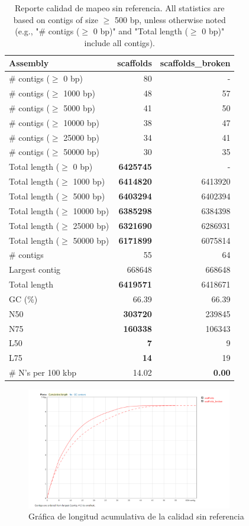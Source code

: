 \documentclass[journal, letterpaper, 11pt]{IEEEtran}
\begin{document}
\begin{table}[H]
\begin{center}
\caption{Reporte calidad de mapeo sin referencia. All statistics are based on contigs of size $\geq$ 500 bp, unless otherwise noted (e.g., "\# contigs ($\geq$ 0 bp)" and "Total length ($\geq$ 0 bp)" include all contigs).}
\begin{tabular}{|l*{2}{|r}|}
\hline
Assembly & scaffolds & scaffolds\_broken \\ \hline
\# contigs ($\geq$ 0 bp) & 80 & - \\ \hline
\# contigs ($\geq$ 1000 bp) & 48 & 57 \\ \hline
\# contigs ($\geq$ 5000 bp) & 41 & 50 \\ \hline
\# contigs ($\geq$ 10000 bp) & 38 & 47 \\ \hline
\# contigs ($\geq$ 25000 bp) & 34 & 41 \\ \hline
\# contigs ($\geq$ 50000 bp) & 30 & 35 \\ \hline
Total length ($\geq$ 0 bp) & {\bf 6425745} & - \\ \hline
Total length ($\geq$ 1000 bp) & {\bf 6414820} & 6413920 \\ \hline
Total length ($\geq$ 5000 bp) & {\bf 6403294} & 6402394 \\ \hline
Total length ($\geq$ 10000 bp) & {\bf 6385298} & 6384398 \\ \hline
Total length ($\geq$ 25000 bp) & {\bf 6321690} & 6286931 \\ \hline
Total length ($\geq$ 50000 bp) & {\bf 6171899} & 6075814 \\ \hline
\# contigs & 55 & 64 \\ \hline
Largest contig & 668648 & 668648 \\ \hline
Total length & {\bf 6419571} & 6418671 \\ \hline
GC (\%) & 66.39 & 66.39 \\ \hline
N50 & {\bf 303720} & 239845 \\ \hline
N75 & {\bf 160338} & 106343 \\ \hline
L50 & {\bf 7} & 9 \\ \hline
L75 & {\bf 14} & 19 \\ \hline
\# N's per 100 kbp & 14.02 & {\bf 0.00} \\ \hline
\end{tabular}
\end{center}
\end{table}

\begin{figure}[H]
\centering
\includegraphics[width=9cm]{imagenes/mapeosin.png}
\caption{Gráfica de longitud acumulativa de la calidad sin referencia}
\end{figure}
\end{document}
